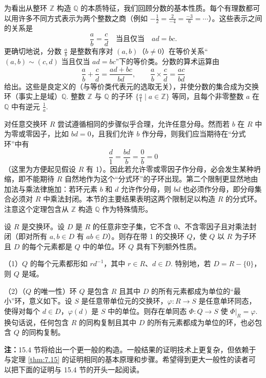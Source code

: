 为看出从整环 \(\mathbb{Z}\) 构造 \(\mathbb{Q}\) 的本质特征，我们回顾分数的基本性质。每个有理数都可以用许多不同方式表示为两个整数之商（例如 \(-\frac12 = \frac{2}{-4} = \frac{-3}{6} = \cdots\)）。这些表示之间的关系是
\[
\frac{a}{b} = \frac{c}{d} \quad \text{当且仅当} \quad ad = bc.
\]
更确切地说，分数 \(\frac{a}{b}\) 是整数有序对 \((a, b)\)（\(b \neq 0\)）在等价关系“\((a, b) \sim (c, d)\) 当且仅当 \(ad = bc\)”下的等价类。分数的算术运算由
\[
\frac{a}{b} + \frac{c}{d} = \frac{ad+bc}{bd}, \qquad \frac{a}{b} \times \frac{c}{d} = \frac{ac}{bd}
\]
给出。这些是良定义的（与等价类代表元的选取无关），并使分数的集合成为交换环（事实上是域）\(\mathbb{Q}\). 整数 \(\mathbb{Z}\) 与 \(\mathbb{Q}\) 的子环 \(\{\frac{a}{1} \mid a \in \mathbb{Z}\}\) 等同，且每个非零整数 \(a\) 在 \(\mathbb{Q}\) 中有逆元 \(\frac{1}{a}\).

对任意交换环 \(R\) 尝试遵循相同的步骤似乎合理，允许任意分母。然而若 \(b\) 在 \(R\) 中为零或零因子，比如 \(bd = 0\)，且我们允许 \(b\) 作分母，则我们应当期待在“分式环”中有
\[
\frac{d}{1} = \frac{bd}{b} = \frac{0}{b} = 0
\]
（这里为方便起见假设 \(R\) 有 1）。因此若允许零或零因子作分母，必会发生某种坍缩，即不能期待 \(R\) 自然地作为这个“分式环”的子环出现。第二个限制更显然地由加法与乘法律施加：若环元素 \(b\) 和 \(d\) 允许作分母，则 \(bd\) 也必须作分母，即分母集合必须对 \(R\) 中乘法封闭。本节的主要结果表明这两个限制足以构造 \(R\) 的分式环。注意这个定理包含从 \(\mathbb{Z}\) 构造 \(\mathbb{Q}\) 作为特殊情形。

\begin{theorem}\label{thm:7.15}
设 \(R\) 是交换环。设 \(D\) 是 \(R\) 的任意非空子集，它不含 0、不含零因子且对乘法封闭（即对所有 \(a, b \in D\) 有 \(ab \in D\)）。则存在带 1 的交换环 \(Q\)，使 \(Q\) 以 \(R\) 为子环且 \(D\) 的每个元素都是 \(Q\) 中的单位。环 \(Q\) 具有下列额外性质。

（1）\(Q\) 的每个元素都形如 \(rd^{-1}\)，其中 \(r \in R\)、\(d \in D\). 特别地，若 \(D = R - \{0\}\)，则 \(Q\) 是域。

（2）（\(Q\) 的唯一性）环 \(Q\) 是包含 \(R\) 且其中 \(D\) 的所有元素都成为单位的“最小”环，意义如下。设 \(S\) 是任意带单位元的交换环，\(\varphi : R \to S\) 是任意单环同态，使得对每个 \(d \in D\)，\(\varphi(d)\) 是 \(S\) 中的单位。则存在单同态 \(\Phi : Q \to S\) 使 \(\Phi|_R = \varphi\). 换句话说，任何包含 \(R\) 的同构复制且其中 \(D\) 的所有元素都成为单位的环，也必包含 \(Q\) 的同构复制。
\end{theorem}

\textbf{注：}15.4 节将给出一个更一般的构造。一般结果的证明技术上更复杂，但依赖于与定理 \ref{thm:7.15} 的证明相同的基本原理和步骤。希望得到更大一般性的读者可以把下面的证明与 15.4 节的开头一起阅读。


